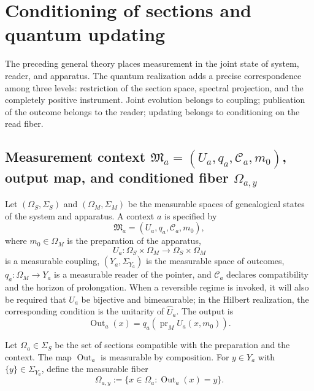 
\section{Conditioning of sections and quantum updating}
\label{sec:medicion-cuantica-genealogica-rev2}

The preceding general theory places measurement in the joint state of
system, reader, and apparatus. The quantum realization adds a precise correspondence
among three levels: restriction of the section space,
spectral projection, and the completely positive instrument. Joint evolution
belongs to coupling; publication of the outcome belongs to the
reader; updating belongs to conditioning on the read fiber.

\subsection{Measurement context \(\mathfrak M_a=(U_a,q_a,\mathcal C_a,m_0)\), output map, and conditioned fiber \(\Omega_{a,y}\)}

Let \((\Omega_S,\Sigma_S)\) and \((\Omega_M,\Sigma_M)\) be the measurable spaces
of genealogical states of the system and apparatus. A context
\(a\) is specified by
\begin{equation}
 \mathfrak M_a=(U_a,q_a,\mathcal C_a,m_0),
 \label{eq:contexto-medida-rev2}
\end{equation}
where \(m_0\in\Omega_M\) is the preparation of the apparatus,
\[
 U_a:\Omega_S\times\Omega_M
 \longrightarrow\Omega_S\times\Omega_M
\]
is a measurable coupling, \((Y_a,\Sigma_{Y_a})\) is the measurable space of
outcomes, \(q_a:\Omega_M\to Y_a\) is a measurable reader of the pointer, and
\(\mathcal C_a\) declares compatibility and the horizon of prolongation.
When a reversible regime is invoked, it will also be required that \(U_a\) be
bijective and bimeasurable; in the Hilbert realization, the
corresponding condition is the unitarity of \(\widehat U_a\).
The output is
\begin{equation}
 \operatorname{Out}_a(x)
 =q_a\!\left(\operatorname{pr}_M U_a(x,m_0)\right).
 \label{eq:salida-contexto-medida-rev2}
\end{equation}

Let \(\Omega_a\in\Sigma_S\) be the set of sections compatible with
the preparation and the context. The map \(\operatorname{Out}_a\) is
measurable by composition. For \(y\in Y_a\) with
\(\{y\}\in\Sigma_{Y_a}\), define the measurable fiber
\begin{equation}
 \Omega_{a,y}
 :=\{x\in\Omega_a:\operatorname{Out}_a(x)=y\}.
 \label{eq:fibra-resultado-medida-rev2}
\end{equation}

